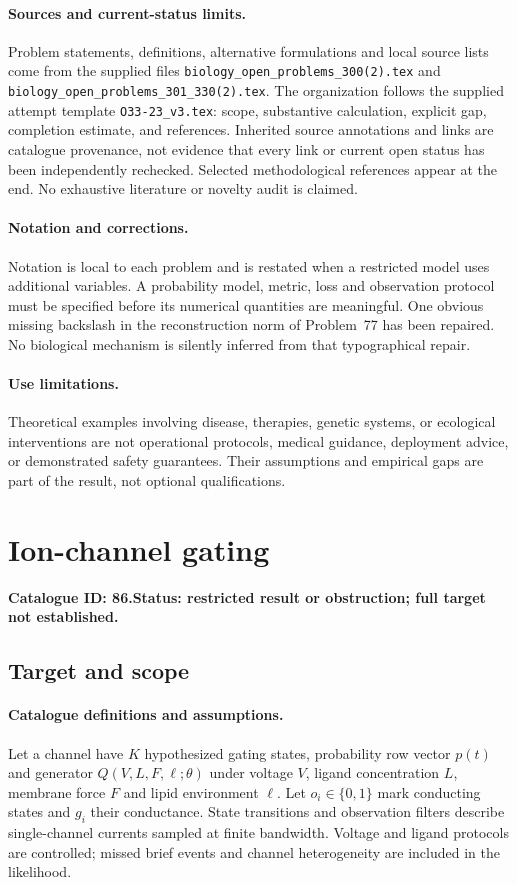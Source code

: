 \documentclass[11pt]{article}
\begin{document}
\paragraph{Sources and current-status limits.}
Problem statements, definitions, alternative formulations and local source lists
come from the supplied files
\texttt{biology\_open\_problems\_300(2).tex} and
\texttt{biology\_open\_problems\_301\_330(2).tex}.
The organization follows the supplied attempt template
\texttt{O33-23\_v3.tex}: scope, substantive calculation, explicit gap,
completion estimate, and references. Inherited source annotations and links are
catalogue provenance, not evidence that every link or current open status has
been independently rechecked. Selected methodological references appear at the
end. No exhaustive literature or novelty audit is claimed.

\paragraph{Notation and corrections.}
Notation is local to each problem and is restated when a restricted model uses
additional variables. A probability model, metric, loss and observation protocol
must be specified before its numerical quantities are meaningful. One obvious
missing backslash in the reconstruction norm of Problem~77 has been repaired.
No biological mechanism is silently inferred from that typographical repair.

\paragraph{Use limitations.}
Theoretical examples involving disease, therapies, genetic systems, or ecological
interventions are not operational protocols, medical guidance, deployment advice,
or demonstrated safety guarantees. Their assumptions and empirical gaps are part
of the result, not optional qualifications.

\setcounter{section}{85}
\section{Ion-channel gating}
\label{prob:086}
\noindent\textbf{Catalogue ID: 86.}\quad \textbf{Status: restricted result or obstruction; full target not established.}
\subsection{Target and scope}
\paragraph{Catalogue definitions and assumptions.}
Let a channel have $K$ hypothesized gating states, probability row vector $p(t)$ and generator $Q(V,L,F,\ell;\theta)$ under voltage $V$, ligand concentration $L$, membrane force $F$ and lipid environment $\ell$. Let $o_i\in\{0,1\}$ mark conducting states and $g_i$ their conductance. State transitions and observation filters describe single-channel currents sampled at finite bandwidth. Voltage and ligand protocols are controlled; missed brief events and channel heterogeneity are included in the likelihood.
\end{document}
